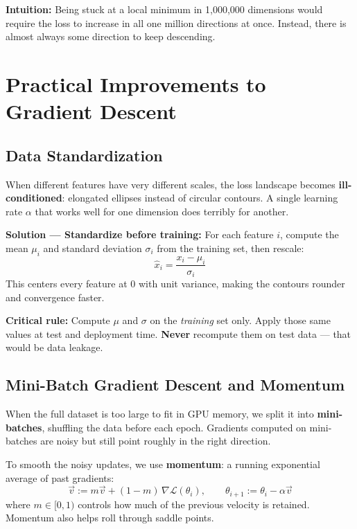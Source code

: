 \documentclass[12pt]{article}
\begin{document}
\begin{takeawaybox}
\textbf{Intuition:} Being stuck at a local minimum in 1,000,000 dimensions would require the loss to increase in all one million directions at once. Instead, there is almost always some direction to keep descending.
\end{takeawaybox}

\section{Practical Improvements to Gradient Descent}

\subsection{Data Standardization}

When different features have very different scales, the loss landscape becomes \textbf{ill-conditioned}: elongated ellipses instead of circular contours. A single learning rate $\alpha$ that works well for one dimension does terribly for another.

\textbf{Solution --- Standardize before training:} For each feature $i$, compute the mean $\mu_i$ and standard deviation $\sigma_i$ from the training set, then rescale:
\[
\hat{x}_i = \frac{x_i - \mu_i}{\sigma_i}
\]
This centers every feature at 0 with unit variance, making the contours rounder and convergence faster.

\begin{notebox}
\textbf{Critical rule:} Compute $\mu$ and $\sigma$ on the \emph{training} set only. Apply those same values at test and deployment time. \textbf{Never} recompute them on test data --- that would be data leakage.
\end{notebox}

\subsection{Mini-Batch Gradient Descent and Momentum}

When the full dataset is too large to fit in GPU memory, we split it into \textbf{mini-batches}, shuffling the data before each epoch. Gradients computed on mini-batches are noisy but still point roughly in the right direction.

To smooth the noisy updates, we use \textbf{momentum}: a running exponential average of past gradients:
\[
\vec{v} := m\vec{v} + (1-m)\,\nabla\mathcal{L}(\theta_i), \qquad \theta_{i+1} := \theta_i - \alpha\vec{v}
\]
where $m \in [0,1)$ controls how much of the previous velocity is retained. Momentum also helps roll through saddle points.
\end{document}
